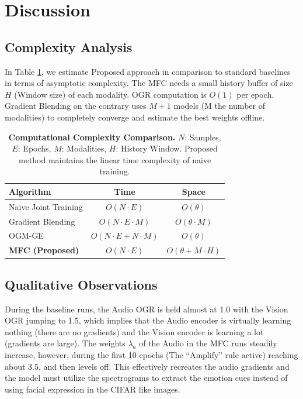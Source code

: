\documentclass{ieeeaccess}
\begin{document}
\section{Discussion}
\subsection{Complexity Analysis}
In Table \ref{tab:complexity}, we estimate Proposed approach in comparison to standard baselines in terms of asymptotic complexity. The MFC needs a small history buffer of size $H$ (Window size) of each modality. OGR computation is $O(1)$ per epoch. Gradient Blending on the contrary uses $M+1$ models (M the number of modalities) to completely converge and estimate the best weights offline.

\begin{table}[h]
\caption{\textbf{Computational Complexity Comparison.} $N$: Samples, $E$: Epochs, $M$: Modalities, $H$: History Window. Proposed method maintains the linear time complexity of naive training.}
\label{tab:complexity}
\centering
\begin{tabularx}{\columnwidth}{@{}Xcc@{}}
\toprule
\textbf{Algorithm} & \textbf{Time} & \textbf{Space} \\ \midrule
Naive Joint Training & $O(N \cdot E)$ & $O(\theta)$ \\
Gradient Blending & $O(N \cdot E \cdot M)$ & $O(\theta \cdot M)$ \\
OGM-GE & $O(N \cdot E + N \cdot M)$ & $O(\theta)$ \\
\textbf{MFC (Proposed)} & $O(N \cdot E)$ & $O(\theta + M \cdot H)$ \\ \bottomrule
\end{tabularx}

\end{table}

\subsection{Qualitative Observations}
During the baseline runs, the Audio OGR is held almost at 1.0 with the Vision OGR jumping to 1.5, which implies that the Audio encoder is virtually learning nothing (there are no gradients) and the Vision encoder is learning a lot (gradients are large). The weights $\lambda_a$ of the Audio in the MFC runs steadily increase, however, during the first 10 epochs (The ``Amplify'' rule active) reaching about 3.5, and then levels off. This effectively recreates the audio gradients and the model must utilize the spectrograms to extract the emotion cues instead of using facial expression in the CIFAR like images.
\end{document}
